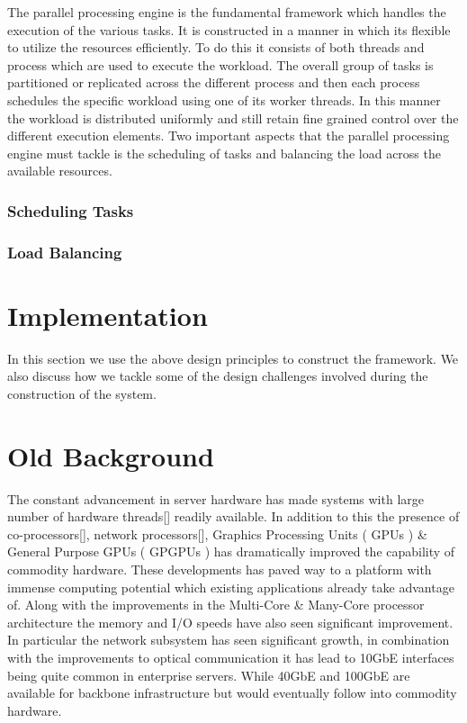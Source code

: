 \documentclass[conference]{IEEEtran}
\begin{document}
The parallel processing engine is the fundamental framework which handles the execution of the various tasks. It is constructed in a manner in which its flexible to utilize the resources efficiently. To do this it consists of both threads and process which are used to execute the workload. The overall group of tasks is partitioned or replicated across the different process and then each process schedules the specific workload using one of its worker threads. In this manner the workload is distributed uniformly and still retain fine grained control over the different execution elements. Two important aspects that the parallel processing engine must tackle is the scheduling of tasks and balancing the load across the available resources.

\subsubsection{Scheduling Tasks}

\subsubsection{Load Balancing}

\section{Implementation}

In this section we use the above design principles to construct the framework. We also discuss how we tackle some of the design challenges involved during the construction of the system.  

\section{Old Background}

The constant advancement in server hardware has made systems with large number of hardware threads[] readily available. In addition to this the presence of co-processors[], network processors[], Graphics Processing Units ( GPUs ) \& General Purpose GPUs ( GPGPUs ) has dramatically improved the capability of commodity hardware. These developments has paved way to a platform with immense computing potential which existing applications already take advantage of. Along with the improvements in the Multi-Core \& Many-Core processor architecture the memory and I/O speeds have also seen significant improvement. In particular the network subsystem has seen significant growth, in combination with the improvements to optical communication it has lead to 10GbE interfaces being quite common in enterprise servers. While 40GbE and 100GbE are available for backbone infrastructure but would eventually follow into commodity hardware. 
\end{document}
